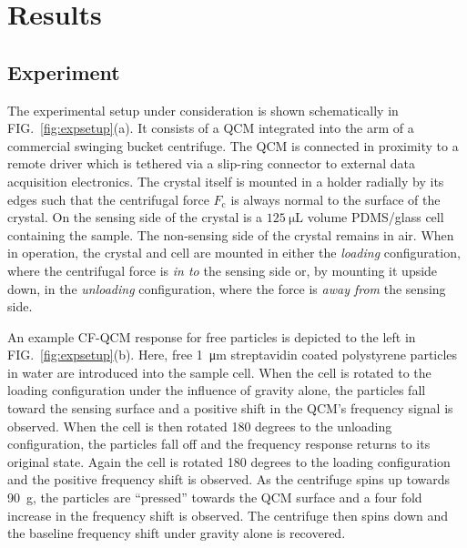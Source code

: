 \documentclass[floatfix,superscriptaddress,a4paper,twocolumn]{revtex4-1}
\newcommand{\Figure}[1]{FIG.~\ref{#1}}
\begin{document}
\section*{Results}
\label{sec:experiment}
\subsection*{Experiment}
The experimental setup under consideration is shown schematically in
\Figure{fig:expsetup}(a).  It consists of a QCM integrated into the arm of
a commercial swinging bucket centrifuge.  The QCM is connected in proximity
to a remote driver which is tethered via a slip-ring connector to external
data acquisition electronics.  The crystal itself is mounted in a holder
radially by its edges such that the centrifugal force $F_\mathrm{c}$ is
always normal to the surface of the crystal.  On the sensing side of the
crystal is a $\SI{125}{\micro\liter}$ volume PDMS/glass cell containing the
sample.  The non-sensing side of the crystal remains in air.
When in
operation, the crystal and cell are mounted in either the \textit{loading}
configuration, where the centrifugal force is \textit{in to} the sensing
side or, by mounting it upside down, in the \textit{unloading}
configuration, where the force is \textit{away from} the sensing side.

An example CF-QCM response for free particles is depicted to the left in
\Figure{fig:expsetup}(b).  Here, free \SI{1}{\micro\meter} streptavidin
coated polystyrene particles in water are introduced into the sample cell.
When the cell is rotated to the loading configuration under the influence
of gravity alone, the particles fall toward the sensing surface and a positive
shift in the QCM's frequency signal is observed.  When the cell is then
rotated 180 degrees to the unloading configuration, the particles fall off
and the frequency response returns to its original state.  Again the cell
is rotated 180 degrees to the loading configuration and the positive
frequency shift is observed.  As the centrifuge spins up towards
\SI{90}{g}, the particles are ``pressed'' towards the QCM surface and a
four fold increase in the frequency shift is observed.  The centrifuge then
spins down and the baseline frequency shift under gravity alone is
recovered.
\end{document}
